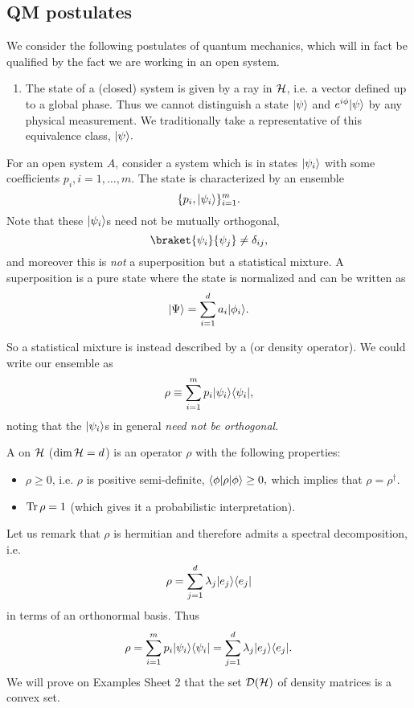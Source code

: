 \subsection*{QM postulates}
We consider the following postulates of quantum mechanics, which will in fact be qualified by the fact we are working in an open system.
\begin{enumerate}
    \item The state of a (closed) system is given by a ray in $\mathcal H$, i.e. a vector defined up to a global phase. Thus we cannot distinguish a state $\lvert\psi\rangle$ and $e^{i\phi}\lvert\psi\rangle$ by any physical measurement. We traditionally take a representative of this equivalence class, $\lvert\psi\rangle.$
\end{enumerate}
For an open system $A$, consider a system which is in states $\lvert\psi_i\rangle$ with some coefficients $p_i, i=1,\ldots, m$. The state is characterized by an ensemble
\begin{equation}
    \{p_i,\lvert\psi_i\rangle\}_{i=1}^m.
\end{equation}
Note that these $\lvert\psi_i\rangle$s need not be mutually orthogonal,
\begin{equation}
    \braket{\psi_i}{\psi_j}\neq \delta_{ij},
\end{equation}
and moreover this is \emph{not} a superposition but a statistical mixture. A superposition is a pure state where the state is normalized and can be written as 
\begin{equation}
    \lvert\Psi\rangle=\sum_{i=1}^d a_i \lvert\phi_i\rangle.
\end{equation}

So a statistical mixture is instead described by a  (or density operator). We could write our ensemble as
\begin{equation}
    \rho \equiv \sum_{i=1}^m p_i \lvert\psi_i\rangle \langle\psi_i\rvert,
\end{equation}
noting that the $\lvert\psi_i\rangle$s in general \emph{need not be orthogonal}.
\begin{defn}
    A  on $\mathcal H$ ($\dim \mathcal H = d$) is an operator $\rho$ with the following properties:
    \begin{itemize}
        \item $\rho \geq 0$, i.e. $\rho$ is positive semi-definite, $\langle\phi\rvert\rho \lvert\phi\rangle\geq 0,$ which implies that $\rho=\rho^\dagger$.
        \item $\operatorname{Tr} \rho =1$ (which gives it a probabilistic interpretation).
    \end{itemize}
\end{defn}
Let us remark that $\rho$ is hermitian and therefore admits a spectral decomposition, i.e.
\begin{equation}
    \rho = \sum_{j=1}^d \lambda_j \lvert e_j\rangle\langle e_j\rvert
\end{equation}
in terms of an orthonormal basis. Thus
\begin{equation}
    \rho=\sum_{i=1}^m p_i \lvert\psi_i\rangle\langle\psi_i\rvert = \sum_{j=1}^d \lambda_j \lvert e_j\rangle \langle e_j\rvert.
\end{equation}
We will prove on Examples Sheet 2 that the set
$\mathcal{D}(\mathcal H)$ of density matrices is a convex set.

